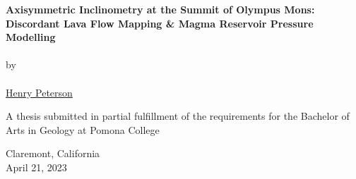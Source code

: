 \begin{titlepage}
    \begin{center}

        \phantom{.}

        \vfill
 
        \large\textbf{Axisymmetric Inclinometry at the Summit of Olympus Mons: Discordant Lava Flow Mapping \& Magma Reservoir Pressure Modelling}
        \\~\\
        by
        \\~\\
        \href{mailto:hgpa2018@mymail.pomona.edu}{Henry Peterson}

        \vfill
        \vfill
        \vfill

        A thesis submitted in partial fulfillment of the requirements for the Bachelor of Arts in Geology at Pomona College

             
        \vfill
        \vfill
        \vfill

        Claremont, California\\
        April 21, 2023

    \end{center}
 \end{titlepage}